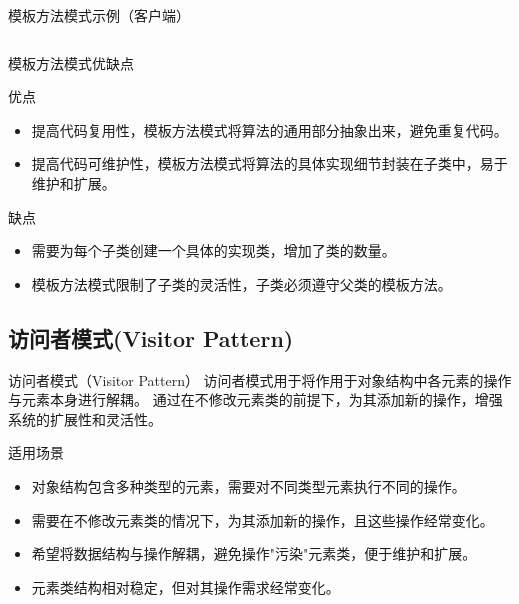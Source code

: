 \documentclass[UTF8,aspectratio=169]{beamer}
\begin{document}
\begin{frame}{模板方法模式示例（客户端）}
    \inputminted[firstline=79, lastline=94]{cpp}{code/template_method_pattern.cpp}
\end{frame}

\begin{frame}{模板方法模式优缺点}
    \begin{ytublock}{优点}
        \begin{itemize}
            \item 提高代码复用性，模板方法模式将算法的通用部分抽象出来，避免重复代码。
            \item 提高代码可维护性，模板方法模式将算法的具体实现细节封装在子类中，易于维护和扩展。
        \end{itemize}
    \end{ytublock}
    \begin{alertytublock}{缺点}
        \begin{itemize}
            \item 需要为每个子类创建一个具体的实现类，增加了类的数量。
            \item 模板方法模式限制了子类的灵活性，子类必须遵守父类的模板方法。
        \end{itemize}
    \end{alertytublock}
\end{frame}

\subsection{访问者模式(Visitor Pattern)}

\begin{frame}{访问者模式（Visitor Pattern）}
    访问者模式用于将作用于对象结构中各元素的操作与元素本身进行解耦。
    通过在不修改元素类的前提下，为其添加新的操作，增强系统的扩展性和灵活性。

    \begin{ytublock}{适用场景}
        \begin{itemize}
            \item 对象结构包含多种类型的元素，需要对不同类型元素执行不同的操作。
            \item 需要在不修改元素类的情况下，为其添加新的操作，且这些操作经常变化。
            \item 希望将数据结构与操作解耦，避免操作"污染"元素类，便于维护和扩展。
            \item 元素类结构相对稳定，但对其操作需求经常变化。
        \end{itemize}
    \end{ytublock}
\end{frame}
\end{document}
